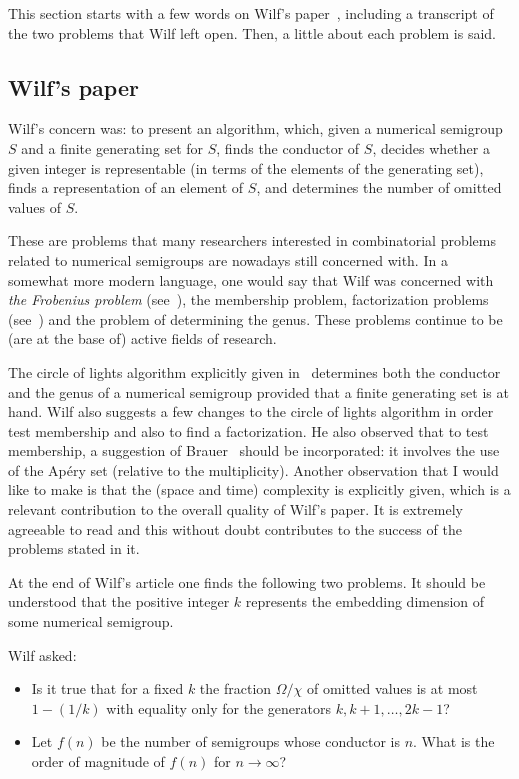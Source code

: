 This section starts with a few words on Wilf's paper~\cite{Wilf1978AMM-circle}, including a transcript of the two problems that Wilf left open. Then, a little about each problem is said.
\subsection{Wilf's paper}
Wilf's concern was: 
to present an algorithm, which, given a numerical semigroup $S$ and a finite generating set for $S$, finds the conductor of $S$, decides whether a given integer is representable (in terms of the elements of the generating set), finds a representation of an element of $S$, and determines the number of omitted values of $S$.

These are problems that many researchers interested in combinatorial problems related to numerical semigroups are nowadays still concerned with. In a somewhat more modern language, one would say that Wilf was concerned with \emph{the Frobenius problem} (see~\cite{Ramirez-Alfonsin2005Book-Diophantine}), the membership problem, factorization problems (see~\cite{GeroldingerHalter-Koch2006}) and the problem of determining the genus.
These problems continue to be (are at the base of) active fields of research. 

The circle of lights algorithm explicitly given in~\cite{Wilf1978AMM-circle} determines both the conductor and the genus of a numerical semigroup provided that a finite generating set is at hand. Wilf also suggests a few changes to the circle of lights algorithm in order test membership and also to find a factorization. He also observed that to test membership, a suggestion of Brauer~\cite{Brauer1942AJM-problem} should be incorporated: it involves the use of the Apéry set (relative to the multiplicity).
Another observation that I would like to make is that the (space and time) complexity is explicitly given, which is a relevant contribution to the overall quality of Wilf's paper. It is extremely agreeable to read and this without doubt contributes to the success of the problems stated in it.

At the end of Wilf's article one finds the following two problems.
It should be understood that the positive integer $k$ represents the embedding dimension of some numerical semigroup. 

\begin{problem}\label{prob:wilf-a-b}
	Wilf asked:
    \begin{itemize}
        \item[$(a)$] Is it true that for a fixed $k$ the fraction $\Omega/\chi$ of omitted values is at most $1-(1/k)$ with equality only for the generators $k,k+1,\ldots,2k-1$?
        \item[$(b)$] Let $f(n)$ be the number of semigroups whose conductor is $n$. What is the order of magnitude of $f(n)$ for $n\to\infty$?
    \end{itemize}
\end{problem}

